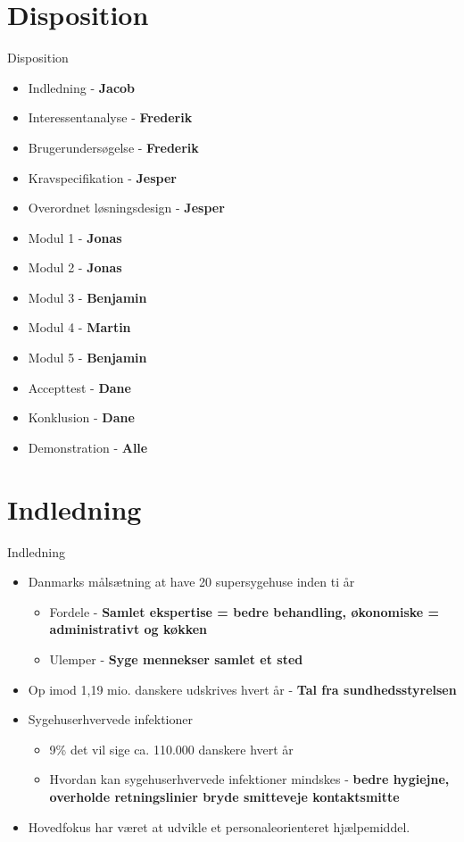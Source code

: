 \documentclass{beamer}
\begin{document}

\section{Disposition}
\begin{frame}{Disposition}
\begin{itemize}
\item Indledning - \textbf{Jacob}
\item Interessentanalyse - \textbf{Frederik}
\item Brugerundersøgelse - \textbf{Frederik}
\item Kravspecifikation - \textbf{Jesper}
\item Overordnet løsningsdesign - \textbf{Jesper}
\item Modul 1 - \textbf{Jonas}
\item Modul 2 - \textbf{Jonas}
\item Modul 3 - \textbf{Benjamin} 
\item Modul 4 - \textbf{Martin}
\item Modul 5 - \textbf{Benjamin}
\item Accepttest - \textbf{Dane}
\item Konklusion - \textbf{Dane} 
\item Demonstration - \textbf{Alle}
\end{itemize}
\end{frame}


\section{Indledning}
\begin{frame}{Indledning}

\begin{itemize}
\item Danmarks målsætning at have 20 supersygehuse inden ti år
\begin{itemize}
\item Fordele - \textbf{Samlet ekspertise = bedre behandling, økonomiske = administrativt og køkken}
\item Ulemper - \textbf{Syge mennekser samlet et sted}
\end{itemize}
\item Op imod 1,19 mio. danskere udskrives hvert år - \textbf{Tal fra sundhedsstyrelsen}
\item Sygehuserhvervede infektioner
\begin{itemize}
\item 9\% det vil sige ca. 110.000 danskere hvert år
\item Hvordan kan sygehuserhvervede infektioner mindskes - \textbf{bedre hygiejne, overholde retningslinier bryde smitteveje kontaktsmitte}
\end{itemize}
\item Hovedfokus har været at udvikle et personaleorienteret hjælpemiddel.
\end{itemize}

\end{frame}
\end{document}
